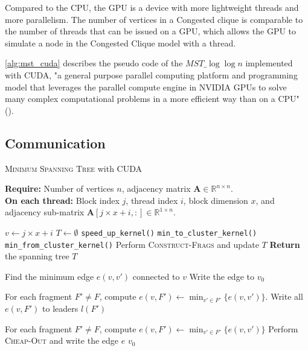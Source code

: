 \documentclass[english, 12pt, a4paper, elec, utf8, a-2b, online]{aaltothesis}
\newcommand{\mstalgo}{$MST\_\log\log{n}$}
\begin{document}
Compared to the CPU, the GPU is a device with more lightweight threads and more parallelism. The number of vertices in a Congested clique is comparable to the number of threads that can be issued on a GPU,
which allows the GPU to simulate a node in the Congested Clique model with a thread.

\cref{alg:mst_cuda} describes the pseudo code of the \mstalgo{} implemented with CUDA, "a general purpose parallel computing platform and programming model that leverages the parallel compute engine in NVIDIA GPUs to solve many complex computational problems in a more efficient way than on a CPU" (\cite{CUDA}).
\subsection{Communication}
\begin{algorithm}
	\caption{\textsc{Minimum Spanning Tree} with CUDA}
	\label{alg:mst_cuda}
	\textbf{Require:} Number of vertices $n$, adjacency matrix $\mathbf{A} \in \mathbb{R}^{n \times n}$.\\
	\textbf{On each thread:} Block index $j$, thread index $i$, block dimension $x$, and adjacency sub-matrix $\mathbf{A}[j \times x + i, :] \in \mathbb{R}^{1 \times n}$.
	\begin{algorithmic}[1]
		\State $v \gets j \times x + i$
		\State $T \gets \emptyset$
				\State \texttt{speed\_up\_kernel()}
			\Else
				\State \texttt{min\_to\_cluster\_kernel()}
				\State \texttt{min\_from\_cluster\_kernel()}
			\EndIf
			\State Perform \textsc{Construct-Frags} and update $T$
		\EndWhile
		\State \textbf{Return} the spanning tree $T$

		\State
			\State Find the minimum edge $e(v, v')$ connected to $v$
			\State Write the edge to $v_0$
		\EndFunction

		\State
		\State For each fragment $F' \neq F$, compute $e(v, F') \gets \min_{v' \in F'} \{ e(v, v') \}$.
		\State Write all $e(v, F')$ to leaders $l(F')$
		\EndFunction

		\State
		\State For each fragment $F' \neq F$, compute $e(v, F') \gets \min_{v' \in F'} \{ e(v, v') \}$
		\State Perform \textsc{Cheap-Out} and write the edge $e$ $v_0$
		\EndFunction
	\end{algorithmic}
\end{algorithm}
\end{document}
